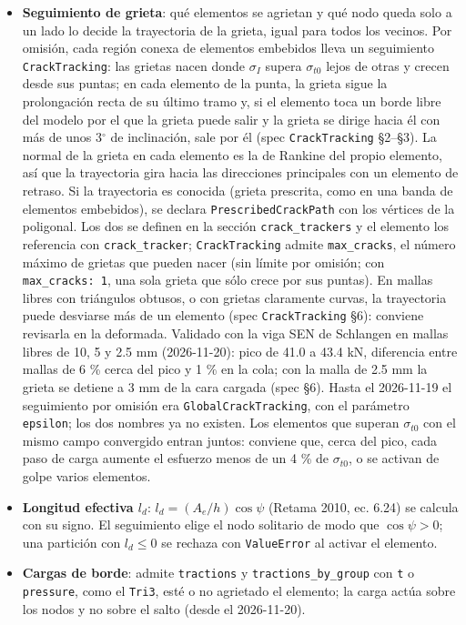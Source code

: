 \documentclass[11pt,oneside]{report}
\begin{document}
\begin{itemize}
  \item \textbf{Seguimiento de grieta}: qué elementos se agrietan y qué nodo queda solo a un lado lo decide la trayectoria de la grieta, igual para todos los vecinos. Por omisión, cada región conexa de elementos embebidos lleva un seguimiento \texttt{CrackTracking}: las grietas nacen donde $\sigma_I$ supera $\sigma_{t0}$ lejos de otras y crecen desde sus puntas; en cada elemento de la punta, la grieta sigue la prolongación recta de su último tramo y, si el elemento toca un borde libre del modelo por el que la grieta puede salir y la grieta se dirige hacia él con más de unos 3\ensuremath{^{\circ}} de inclinación, sale por él (spec \texttt{CrackTracking} §2--§3). La normal de la grieta en cada elemento es la de Rankine del propio elemento, así que la trayectoria gira hacia las direcciones principales con un elemento de retraso. Si la trayectoria es conocida (grieta prescrita, como en una banda de elementos embebidos), se declara \texttt{PrescribedCrackPath} con los vértices de la poligonal. Los dos se definen en la sección \texttt{crack\_trackers} y el elemento los referencia con \texttt{crack\_tracker}; \texttt{CrackTracking} admite \texttt{max\_cracks}, el número máximo de grietas que pueden nacer (sin límite por omisión; con \texttt{max\_cracks: 1}, una sola grieta que sólo crece por sus puntas). En mallas libres con triángulos obtusos, o con grietas claramente curvas, la trayectoria puede desviarse más de un elemento (spec \texttt{CrackTracking} §6): conviene revisarla en la deformada. Validado con la viga SEN de Schlangen en mallas libres de 10, 5 y 2.5 mm (2026-11-20): pico de 41.0 a 43.4 kN, diferencia entre mallas de 6 \% cerca del pico y 1 \% en la cola; con la malla de 2.5 mm la grieta se detiene a 3 mm de la cara cargada (spec §6). Hasta el 2026-11-19 el seguimiento por omisión era \texttt{GlobalCrackTracking}, con el parámetro \texttt{epsilon}; los dos nombres ya no existen. Los elementos que superan $\sigma_{t0}$ con el mismo campo convergido entran juntos: conviene que, cerca del pico, cada paso de carga aumente el esfuerzo menos de un 4 \% de $\sigma_{t0}$, o se activan de golpe varios elementos.
  \item \textbf{Longitud efectiva $l_d$}: $l_d = (A_e/h)\cos\psi$ (Retama 2010, ec. 6.24) se calcula con su signo. El seguimiento elige el nodo solitario de modo que $\cos\psi > 0$; una partición con $l_d \le 0$ se rechaza con \texttt{ValueError} al activar el elemento.
  \item \textbf{Cargas de borde}: admite \texttt{tractions} y \texttt{tractions\_\allowbreak{}by\_\allowbreak{}group} con \texttt{t} o \texttt{pressure}, como el \texttt{Tri3}, esté o no agrietado el elemento; la carga actúa sobre los nodos y no sobre el salto (desde el 2026-11-20).

\end{itemize}
\end{document}
